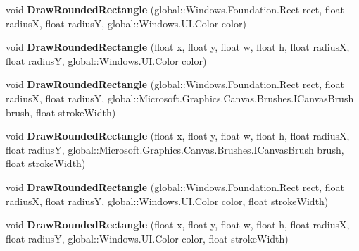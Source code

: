 \begin{DoxyCompactItemize}
void {\bfseries Draw\+Rounded\+Rectangle} (global\+::\+Windows.\+Foundation.\+Rect rect, float radiusX, float radiusY, global\+::\+Windows.\+U\+I.\+Color color)
\item 
\mbox{\label{class_microsoft_1_1_graphics_1_1_canvas_1_1_canvas_drawing_session_a4796822b098305408fa7a331119d16b6}} 
void {\bfseries Draw\+Rounded\+Rectangle} (float x, float y, float w, float h, float radiusX, float radiusY, global\+::\+Windows.\+U\+I.\+Color color)
\item 
\mbox{\label{class_microsoft_1_1_graphics_1_1_canvas_1_1_canvas_drawing_session_aecf1fc7b87f19919d0da566e2c11637b}} 
void {\bfseries Draw\+Rounded\+Rectangle} (global\+::\+Windows.\+Foundation.\+Rect rect, float radiusX, float radiusY, global\+::\+Microsoft.\+Graphics.\+Canvas.\+Brushes.\+I\+Canvas\+Brush brush, float stroke\+Width)
\item 
\mbox{\label{class_microsoft_1_1_graphics_1_1_canvas_1_1_canvas_drawing_session_a144caad7726c38792ffdc994862564d2}} 
void {\bfseries Draw\+Rounded\+Rectangle} (float x, float y, float w, float h, float radiusX, float radiusY, global\+::\+Microsoft.\+Graphics.\+Canvas.\+Brushes.\+I\+Canvas\+Brush brush, float stroke\+Width)
\item 
\mbox{\label{class_microsoft_1_1_graphics_1_1_canvas_1_1_canvas_drawing_session_a9204fb7281dd18db23c2b82bfe93b12e}} 
void {\bfseries Draw\+Rounded\+Rectangle} (global\+::\+Windows.\+Foundation.\+Rect rect, float radiusX, float radiusY, global\+::\+Windows.\+U\+I.\+Color color, float stroke\+Width)
\item 
\mbox{\label{class_microsoft_1_1_graphics_1_1_canvas_1_1_canvas_drawing_session_ac3b21bf0fd13d6deeccfb6ee5843eedc}} 
void {\bfseries Draw\+Rounded\+Rectangle} (float x, float y, float w, float h, float radiusX, float radiusY, global\+::\+Windows.\+U\+I.\+Color color, float stroke\+Width)
\item 
\mbox{\label{class_microsoft_1_1_graphics_1_1_canvas_1_1_canvas_drawing_session_a247f566adb4e90125681518025faef0b}} 

\end{DoxyCompactItemize}
